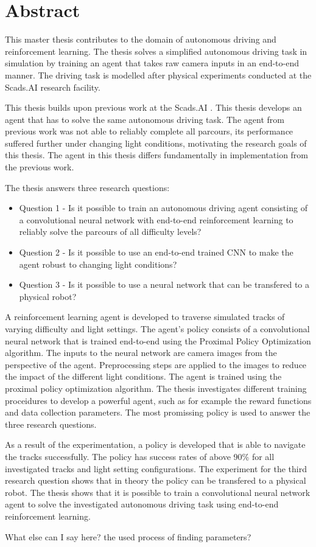 \section*{Abstract}
\label{sec:Abstract}

This master thesis contributes to the domain of autonomous driving and reinforcement learning. The thesis solves a simplified autonomous driving task in simulation by training an agent that takes raw camera inputs in an end-to-end manner. The driving task is modelled after physical experiments conducted at the Scads.AI research facility.

This thesis builds upon previous work at the Scads.AI \autocite{maximilian}. This thesis develops an agent that has to solve the same autonomous driving task. The agent from previous work was not able to reliably complete all parcours, its performance suffered further under changing light conditions, motivating the research goals of this thesis. The agent in this thesis differs fundamentally in implementation from the previous work.

The thesis answers three research questions:
\begin{itemize}
    \item Question 1 - Is it possible to train an autonomous driving agent consisting of a convolutional neural network with end-to-end reinforcement learning to reliably solve the parcours of all difficulty levels?
    \item Question 2 - Is it possible to use an end-to-end trained CNN to make the agent robust to changing light conditions?
    \item Question 3 - Is it possible to use a neural network that can be transfered to a physical robot?
\end{itemize}
A reinforcement learning agent is developed to traverse simulated tracks of varying difficulty and light settings. The agent's policy consists of a convolutional neural network that is trained end-to-end using the Proximal Policy Optimization algorithm. The inputs to the neural network are camera images from the perspective of the agent. Preprocessing steps are applied to the images to reduce the impact of the different light conditions. The agent is trained using the proximal policy optimization algorithm.
The thesis investigates different training proceidures to develop a powerful agent, such as for example the reward functions and data collection parameters. The most promissing policy is used to answer the three research questions.

As a result of the experimentation, a policy is developed that is able to navigate the tracks successfully. The policy has success rates of above 90\% for all investigated tracks and light setting configurations. The experiment for the third research question shows that in theory the policy can be transfered to a physical robot.
The thesis shows that it is possible to train a convolutional neural network agent to solve the investigated autonomous driving task using end-to-end reinforcement learning.


What else can I say here?
the used process of finding parameters?
